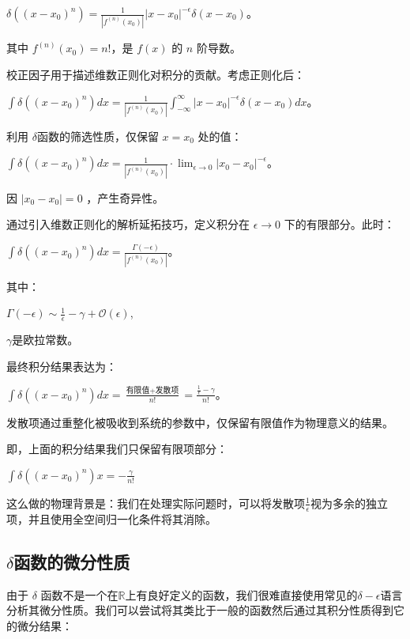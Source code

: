 \documentclass[lang=cn,10pt,newtx,bibend=biber,device=pad]{elegantbook}
\begin{document}
\begin{enumerate}
\begin{enumerate}
\begin{example}
        $\delta((x - x_0)^n) = \frac{1}{|f^{(n)}(x_0)|} |x - x_0|^{-\epsilon} \delta(x - x_0)$。

        其中  $f^{(n)}(x_0) = n!$，是  $f(x)$  的  $n$  阶导数。

        校正因子用于描述维数正则化对积分的贡献。考虑正则化后：

        $\int \delta((x - x_0)^n) dx = \frac{1}{|f^{(n)}(x_0)|} \int_{-\infty}^\infty |x - x_0|^{-\epsilon} \delta(x - x_0) dx$。

        利用 $\delta$函数的筛选性质，仅保留  $x = x_0$  处的值：

        $\int \delta((x - x_0)^n) dx = \frac{1}{|f^{(n)}(x_0)|} \cdot \lim_{\epsilon \to 0} |x_0 - x_0|^{-\epsilon}$。

        因  $|x_0 - x_0| = 0$ ，产生奇异性。

        通过引入维数正则化的解析延拓技巧，定义积分在  $\epsilon \to 0$  下的有限部分。此时：

        $\int \delta((x - x_0)^n) dx = \frac{\Gamma(-\epsilon)}{|f^{(n)}(x_0)|}$。

        其中：

        $\Gamma(-\epsilon) \sim \frac{1}{\epsilon} - \gamma + \mathcal{O}(\epsilon)$,

        $\gamma$是欧拉常数。

        最终积分结果表达为：

        $\int \delta((x - x_0)^n) dx = \frac{\text{有限值} + \text{发散项}}{n!}=\frac{\frac{1}{\epsilon} - \gamma}{n!}$。

        发散项通过重整化被吸收到系统的参数中，仅保留有限值作为物理意义的结果。

        即，上面的积分结果我们只保留有限项部分：

        $\int \delta((x-x_0)^n)x = -\frac{\gamma}{n!}$

        这么做的物理背景是：我们在处理实际问题时，可以将发散项$\frac{1}{\epsilon}$视为多余的独立项，并且使用全空间归一化条件将其消除。
        \end{example}
    \end{enumerate}
\end{enumerate}
\subsection{$\delta$函数的微分性质}
由于 $\delta$ 函数不是一个在$\mathbb{R}$上有良好定义的函数，我们很难直接使用常见的$\delta - \epsilon$语言分析其微分性质。我们可以尝试将其类比于一般的函数然后通过其积分性质得到它的微分结果：
\end{document}
